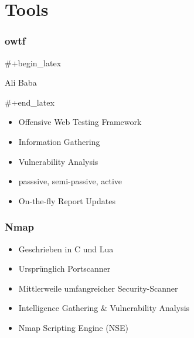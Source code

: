 \documentclass[11pt]{beamer}
\begin{document}
\section{Tools}
\label{sec-2}
\begin{frame}[fragile]\frametitle{owtf}
\label{sec-2-1}

#+begin\_latex
{
\begin{frame}{Ali Baba}
\end{frame}
}
#+end\_latex
\begin{itemize}

\item Offensive Web Testing Framework\\
\label{sec-2-1-1}%
\item Information Gathering\\
\label{sec-2-1-2}%
\item Vulnerability Analysis\\
\label{sec-2-1-3}%
\item passsive, semi-passive, active\\
\label{sec-2-1-4}%
\item On-the-fly Report Updates\\
\label{sec-2-1-5}%
\end{itemize} %
\end{frame}
\begin{frame}[fragile]\frametitle{Nmap}
\label{sec-2-2}
\begin{itemize}

\item Geschrieben in C und Lua\\
\label{sec-2-2-1}%
\item Ursprünglich Portscanner\\
\label{sec-2-2-2}%
\item Mittlerweile umfangreicher Security-Scanner\\
\label{sec-2-2-3}%
\item Intelligence Gathering \& Vulnerability Analysis\\
\label{sec-2-2-4}%
\item Nmap Scripting Engine (NSE)\\
\label{sec-2-2-5}%
\end{itemize} %
\end{frame}
\end{document}
